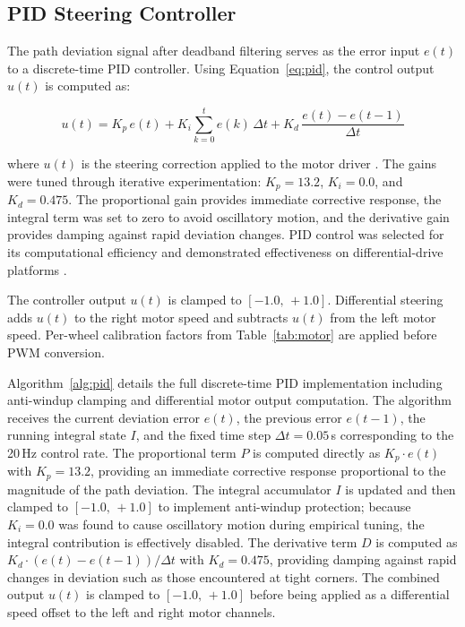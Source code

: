 \subsection{PID Steering Controller}

The path deviation signal after deadband filtering serves as the error
input $e(t)$ to a discrete-time PID controller. Using
Equation~\eqref{eq:pid}, the control output $u(t)$ is computed as:

\begin{equation}
  u(t) = K_p \, e(t)
       + K_i \sum_{k=0}^{t} e(k)\,\Delta t
       + K_d \, \frac{e(t) - e(t-1)}{\Delta t}
  \label{eq:pid}
\end{equation}

where $u(t)$ is the steering correction applied to the motor driver
\cite{r9,r10,r11}.
The gains were tuned through iterative experimentation: $K_p = 13.2$,
$K_i = 0.0$, and $K_d = 0.475$. The proportional gain provides
immediate corrective response, the integral term was set to zero to
avoid oscillatory motion, and the derivative gain provides damping
against rapid deviation changes. PID control was selected for its
computational efficiency and demonstrated effectiveness on
differential-drive platforms \cite{r10,r9,r11}.

The controller output $u(t)$ is clamped to $[-1.0,\,+1.0]$. Differential
steering adds $u(t)$ to the right motor speed and subtracts $u(t)$
from the left motor speed. Per-wheel calibration factors from
Table~\ref{tab:motor} are applied before PWM conversion.

Algorithm~\ref{alg:pid} details the full discrete-time PID implementation including anti-windup clamping and differential motor output computation. The algorithm receives the current deviation error $e(t)$, the previous error $e(t{-}1)$, the running integral state $I$, and the fixed time step $\Delta t = 0.05$\,s corresponding to the 20\,Hz control rate. The proportional term $P$ is computed directly as $K_p \cdot e(t)$ with $K_p = 13.2$, providing an immediate corrective response proportional to the magnitude of the path deviation. The integral accumulator $I$ is updated and then clamped to $[-1.0,\,+1.0]$ to implement anti-windup protection; because $K_i = 0.0$ was found to cause oscillatory motion during empirical tuning, the integral contribution is effectively disabled. The derivative term $D$ is computed as $K_d \cdot (e(t) - e(t{-}1)) / \Delta t$ with $K_d = 0.475$, providing damping against rapid changes in deviation such as those encountered at tight corners. The combined output $u(t)$ is clamped to $[-1.0,\,+1.0]$ before being applied as a differential speed offset to the left and right motor channels.

